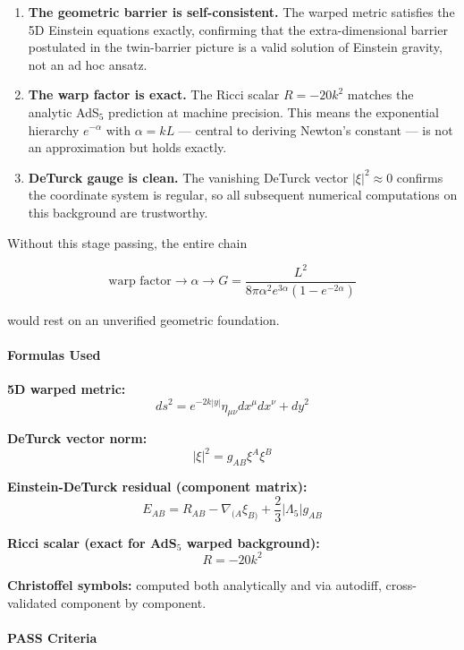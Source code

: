 \documentclass[
  11pt,
]{article}
\begin{document}
\begin{enumerate}
\def\labelenumi{\arabic{enumi}.}
\item
  \textbf{The geometric barrier is self-consistent.} The warped metric
  satisfies the 5D Einstein equations exactly, confirming that the
  extra-dimensional barrier postulated in the twin-barrier picture is a
  valid solution of Einstein gravity, not an ad hoc ansatz.
\item
  \textbf{The warp factor is exact.} The Ricci scalar \(R = -20k^2\)
  matches the analytic AdS\(_5\) prediction at machine precision. This
  means the exponential hierarchy \(e^{-\alpha}\) with \(\alpha = kL\)
  --- central to deriving Newton's constant --- is not an approximation
  but holds exactly.
\item
  \textbf{DeTurck gauge is clean.} The vanishing DeTurck vector
  \(|\xi|^2 \approx 0\) confirms the coordinate system is regular, so
  all subsequent numerical computations on this background are
  trustworthy.
\end{enumerate}

Without this stage passing, the entire chain

\[\text{warp factor} \to \alpha \to G = \frac{L^2}{8\pi\alpha^2 e^{3\alpha}(1 - e^{-2\alpha})} \tag{101}\]

would rest on an unverified geometric foundation.

\bigskip

\hypertarget{formulas-used}{%
\paragraph{Formulas Used}\label{formulas-used}}

\textbf{5D warped metric:}
\[ds^2 = e^{-2k|y|}\eta_{\mu\nu}dx^\mu dx^\nu + dy^2 \tag{102}\]

\textbf{DeTurck vector norm:} \[|\xi|^2 = g_{AB}\xi^A\xi^B \tag{103}\]

\textbf{Einstein-DeTurck residual (component matrix):}
\[E_{AB} = R_{AB} - \nabla_{(A}\xi_{B)} + \frac{2}{3}|\Lambda_5| g_{AB} \tag{104}\]

\textbf{Ricci scalar (exact for AdS\(_5\) warped background):}
\[R = -20k^2 \tag{105}\]

\textbf{Christoffel symbols:} computed both analytically and via
autodiff, cross-validated component by component.

\bigskip

\hypertarget{pass-criteria}{%
\paragraph{PASS Criteria}\label{pass-criteria}}
\end{document}

